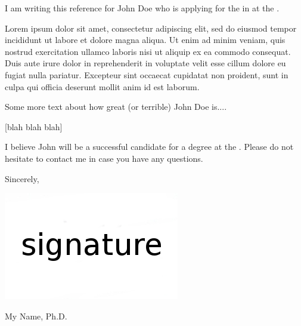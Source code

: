 \documentclass[10pt]{article}
\begin{document}
\thispagestyle{empty}

\vspace*{1cm}



\vspace*{1cm}  

I am writing this reference for John Doe who is applying for the \degree{} in \dept{} at the \univ{}.

Lorem ipsum dolor sit amet, consectetur adipiscing elit, sed do eiusmod tempor incididunt ut labore et dolore magna aliqua. Ut enim ad minim veniam, quis nostrud exercitation ullamco laboris nisi ut aliquip ex ea commodo consequat. Duis aute irure dolor in reprehenderit in voluptate velit esse cillum dolore eu fugiat nulla pariatur. Excepteur sint occaecat cupidatat non proident, sunt in culpa qui officia deserunt mollit anim id est laborum.

Some more text about how great (or terrible) John Doe is....


[blah blah blah]

I believe John will be a successful candidate for a \degree{} degree at the \univshort{}.
Please do not hesitate to contact me in case you have any questions. 


Sincerely,

\vspace*{0.2cm}

\noindent\includegraphics[scale=0.3]{signature.png} 

\vspace*{0.2cm}
\noindent My Name, Ph.D. \\
\end{document}
